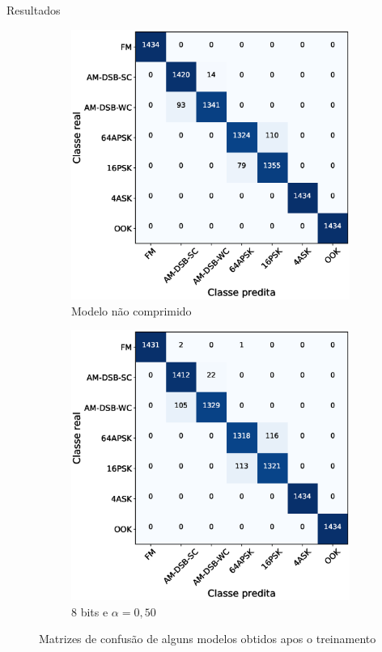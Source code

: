 \begin{frame}{Resultados}
    \begin{figure}[H]
  \centering

  \begin{subfigure}[b]{0.45\textwidth}
    \includegraphics[width=\textwidth]{figuras/cm_nocompress.eps}
    \caption{Modelo não comprimido}
    \label{fig:subfig1}
  \end{subfigure}
  \hfill
  \begin{subfigure}[b]{0.45\textwidth}
    \includegraphics[width=\textwidth]{figuras/cm_8_050.eps}
    \caption{$8$ bits e $\alpha=0,50$}
    \label{fig:subfig2}
  \end{subfigure}
  \caption{Matrizes de confusão de alguns modelos obtidos apos o treinamento}
  \end{figure}

\end{frame}

